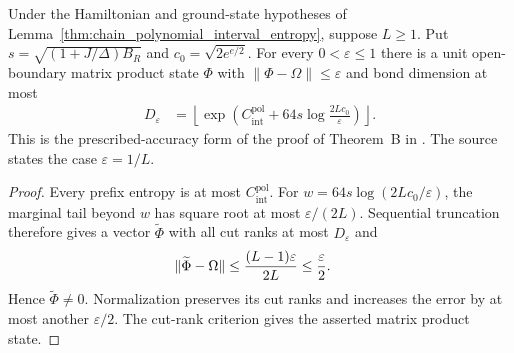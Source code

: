 \begin{corollary}
    \label{thm:chain_polynomial_mps_accuracy}
    \leanok
    Under the Hamiltonian and ground-state hypotheses of
    Lemma~\ref{thm:chain_polynomial_interval_entropy}, suppose $L\ge1$.
    Put $s=\sqrt{(1+J/\Delta)B_R}$ and $c_0=\sqrt{2e^{e/2}}$.
    For every $0<\varepsilon\le1$ there is a unit open-boundary matrix
    product state $\Phi$ with $\|\Phi-\Omega\|\le\varepsilon$ and
    bond dimension at most
    \begin{align}
        D_\varepsilon
         & =\left\lfloor\exp\left(C_{\mathrm{int}}^{\mathrm{pol}}
        +64s\log\frac{2Lc_0}{\varepsilon}\right)\right\rfloor.
        \label{eq:chain_polynomial_mps_accuracy}
    \end{align}
    This is the prescribed-accuracy form of the proof of Theorem~B
    in \cite[Part~IIa]{TNLean2026OneDimensional}.
    The source states the case $\varepsilon=1/L$.
\end{corollary}
\begin{proof}
    \leanok
    Every prefix entropy is at most $C_{\mathrm{int}}^{\mathrm{pol}}$.
    For $w=64s\log(2Lc_0/\varepsilon)$, the marginal tail beyond $w$
    has square root at most $\varepsilon/(2L)$. Sequential truncation
    therefore gives a vector $\widetilde\Phi$ with all cut ranks at most
    $D_\varepsilon$ and
    \begin{align}
        \|\widetilde\Phi-\Omega\|
         & \le\frac{(L-1)\varepsilon}{2L}\le\frac\varepsilon2.\notag
    \end{align}
    Hence $\widetilde\Phi\ne0$. Normalization preserves its cut ranks
    and increases the error by at most another $\varepsilon/2$.
    The cut-rank criterion gives the asserted matrix product state.
\end{proof}

